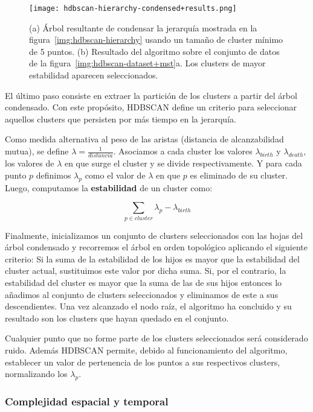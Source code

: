 \begin{figure}[!h]
    \centering
    \texttt{[image: hdbscan-hierarchy-condensed+results.png]}
    \caption{(a) Árbol resultante de condensar la jerarquía mostrada en la figura~\ref{img:hdbscan-hierarchy} usando un tamaño de cluster mínimo de 5 puntos. (b) Resultado del algoritmo sobre el conjunto de datos de la figura~\ref{img:hdbscan-dataset+mst}a.
    Los clusters de mayor estabilidad aparecen seleccionados.}
    \label{img:hdbscan-hierarchy-condensed+results}
\end{figure}

El último paso consiste en extraer la partición de los clusters a partir del árbol condensado.
Con este propósito, HDBSCAN define un criterio para seleccionar aquellos clusters que persisten por más tiempo en la jerarquía.

Como medida alternativa al peso de las aristas (distancia de alcanzabilidad mutua), se define $\lambda=\frac{1}{distancia}$.
Asociamos a cada cluster los valores $\lambda_{birth}$ y $\lambda_{death}$, los valores de $\lambda$ en que surge el cluster y se divide respectivamente.
Y para cada punto $p$ definimos $\lambda_p$ como el valor de $\lambda$ en que $p$ es eliminado de su cluster.
Luego, computamos la \textbf{estabilidad} de un cluster como:

\begin{equation*}
    \sum_{p\in cluster}{\lambda_p - \lambda_{birth}}
\end{equation*}

Finalmente, inicializamos un conjunto de clusters seleccionados con las hojas del árbol condensado y recorremos el árbol en orden topológico aplicando el siguiente criterio:
Si la suma de la estabilidad de los hijos es mayor que la estabilidad del cluster actual, sustituimos este valor por dicha suma.
Si, por el contrario, la estabilidad del cluster es mayor que la suma de las de sus hijos entonces lo añadimos al conjunto de clusters seleccionados y eliminamos de este a sus descendientes.
Una vez alcanzado el nodo raíz, el algoritmo ha concluido y su resultado son los clusters que hayan quedado en el conjunto.

Cualquier punto que no forme parte de los clusters seleccionados será considerado ruido.
Además HDBSCAN permite, debido al funcionamiento del algoritmo, establecer un valor de pertenencia de los puntos a sus respectivos clusters, normalizando los $\lambda_p$.

\subsubsection{Complejidad espacial y temporal}

